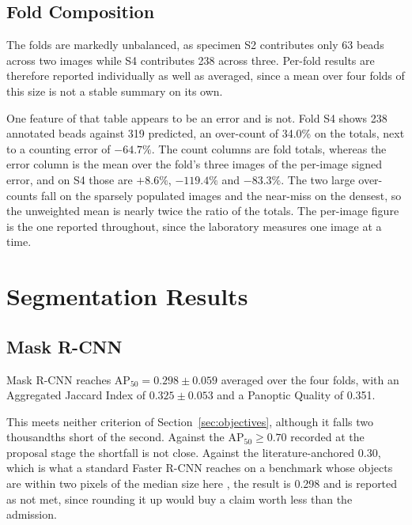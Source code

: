 \subsection{Fold Composition}



The folds are markedly unbalanced, as specimen S2 contributes only 63 beads across
two images while S4 contributes 238 across three. Per-fold results are
therefore reported individually as well as averaged, since a mean over four folds
of this size is not a stable summary on its own.

One feature of that table appears to be an error and is not. Fold S4 shows 238
annotated beads against 319 predicted, an over-count of 34.0\% on the totals, next
to a counting error of $-64.7\%$. The count columns are fold totals, whereas the
error column is the mean over the fold's three images of the per-image
signed error, and on S4 those are $+8.6\%$, $-119.4\%$ and $-83.3\%$. The two
large over-counts fall on the sparsely populated images and the near-miss on
the densest, so the unweighted mean is nearly twice the ratio of the totals. The
per-image figure is the one reported throughout, since the laboratory
measures one image at a time.

\section{Segmentation Results}

\subsection{Mask R-CNN}



Mask R-CNN reaches $\mathrm{AP}_{50} = 0.298 \pm 0.059$ averaged over the four
folds, with an Aggregated Jaccard Index of $0.325 \pm 0.053$ and a Panoptic
Quality of 0.351.

This meets neither criterion of Section~\ref{sec:objectives}, although it
falls two thousandths short of the second. Against the
$\mathrm{AP}_{50} \geq 0.70$ recorded at the proposal stage the shortfall is not
close. Against the literature-anchored 0.30, which is what a standard Faster R-CNN
reaches on a benchmark whose objects are within two pixels of the median size here
\cite{xu2022tiny}, the result is 0.298 and is reported as not met, since rounding
it up would buy a claim worth less than the admission.


